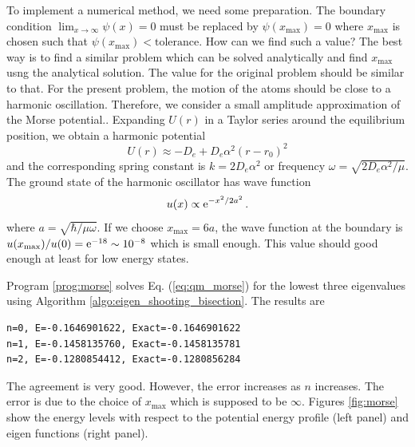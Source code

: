 To implement a numerical method, we need some preparation.
The boundary condition $\displaystyle\lim_{x \rightarrow \infty} \psi(x)=0$ must be replaced by $\psi(x_\text{max}) = 0$ where $x_\text{max}$ is chosen such that $\psi(x_\text{max}) < \text{tolerance}$.  How can we find such a value?  The best way is to find a similar problem which can be solved analytically and find  $x_\text{max}$ usng the analytical solution.  The value for the original problem should be similar to that. For the present problem, the motion of the atoms should be close to a harmonic oscillation. Therefore, we consider a small amplitude approximation of the Morse potential.\cite{hooke}.  Expanding $U(r)$ in a Taylor series around the equilibrium position, we obtain a harmonic potential
\begin{equation}
U(r) \approx -D_e + D_e \alpha^2 (r-r_0)^2
\end{equation}
and the corresponding spring constant is $k=2 D_e \alpha^2$ or frequency $\omega = \sqrt{2 D_e \alpha^2 / \mu}$.  The ground state of the harmonic oscillator has wave function
\begin{equation}
u(x) \propto \text{e}^{- x^2/2 a^2 }\, .
\end{equation}
where $a=\sqrt{\hbar/\mu \omega}$.
If we choose $x_\text{max} = 6 a$, the wave function at the boundary is $u(x_\text{max})/u(0) = \text{e}^{-18}\sim 10^{-8}$ which is small enough.  This value should good enough at least for low energy states.

Program \ref{prog:morse} solves Eq. (\ref{eq:qm_morse})  for the lowest three eigenvalues using Algorithm \ref{algo:eigen_shooting_bisection}.   The results are
\begin{center}
\begin{minipage}{4in}
\small
\begin{Verbatim}[frame=single]
n=0, E=-0.1646901622, Exact=-0.1646901622
n=1, E=-0.1458135760, Exact=-0.1458135781
n=2, E=-0.1280854412, Exact=-0.1280856284
\end{Verbatim}
\normalsize
\end{minipage}
\end{center}
The agreement is very good.  However, the error increases as $n$ increases.  The error is due to the choice of $x_\text{max}$ which is supposed to be $\infty$.  Figures \ref{fig:morse} show the energy levels with respect to the potential energy profile (left panel) and eigen functions (right panel).


